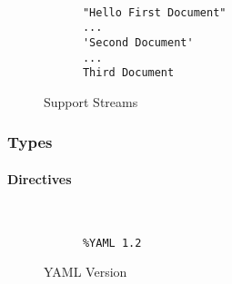 \begin{figure}[H]
  \begin{minipage}[t]{0.48\textwidth}
    \vspace{0pt}
    \begin{bchart}[max=9, width=0.85\textwidth]
    \end{bchart}
  \end{minipage}
  \begin{minipage}[t]{0pt}~\end{minipage}
  \begin{minipage}[t]{0.48\textwidth}
    \vspace{0pt}
    \begin{verbatim}
      "Hello First Document"
      ...
      'Second Document'
      ...
      Third Document
    \end{verbatim}
  \end{minipage}
  \caption{Support Streams}
\end{figure}

\subsubsection{Types}

\paragraph{Directives}

\begin{figure}[H]
  \begin{minipage}[t]{0.48\textwidth}
    \vspace{0pt}
    \begin{bchart}[max=9, width=0.85\textwidth]
    \end{bchart}
  \end{minipage}
  \begin{minipage}[t]{0pt}~\end{minipage}
  \begin{minipage}[t]{0.48\textwidth}
    \vspace{0pt}
    \begin{verbatim}
      %YAML 1.2
    \end{verbatim}
  \end{minipage}
  \caption{YAML Version}
\end{figure}

